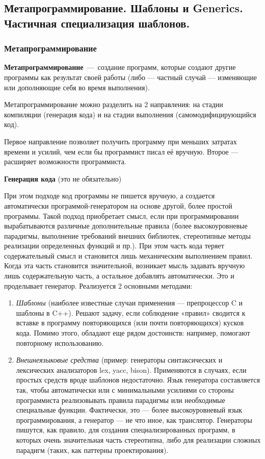 \subsection{Метапрограммирование. Шаблоны и Generics. Частичная специализация шаблонов.}

\subsubsection{Метапрограммирование}

\textbf{Метапрограммирование}~---~создание программ, которые создают другие программы как результат своей работы (либо — частный случай — изменяющие или дополняющие себя во время выполнения).

Метапрограммирование можно разделить на 2 направления: на стадии компиляции (генерация кода) и на стадии выполнения (самомодифицирующийся код).

Первое направление позволяет получить программу при меньших затратах времени и усилий, чем если бы программист писал её вручную. Второе — расширяет возможности программиста.

\textbf{Генерация кода} (это не обязательно)

При этом подходе код программы не пишется вручную, а создается автоматически программой-генератором на основе другой, более простой программы.
Такой подход приобретает смысл, если при программировании вырабатываются различные дополнительные правила (более высокоуровневые парадигмы, выполнение требований внешних библиотек, стереотипные методы реализации определенных функций и пр.). При этом часть кода теряет содержательный смысл и становится лишь механическим выполнением правил. Когда эта часть становится значительной, возникает мысль задавать вручную лишь содержательную часть, а остальное добавлять автоматически. Это и проделывает генератор. Реализуется 2 основными методами:

\begin{enumerate}
	\item  \emph{Шаблоны} (наиболее известные случаи применения — препроцессор C и шаблоны в C++). Решают задачу, если соблюдение «правил» сводится к вставке в программу повторяющихся (или почти повторяющихся) кусков кода. Помимо этого, обладают еще рядом достоинств: например, помогают повторному использованию.
	\item \emph{Внешнеязыковые средства} (пример: генераторы синтаксических и лексических анализаторов lex, yacc, bison). Применяются в случаях, если простых средств вроде шаблонов недостаточно. Язык генератора составляется так, чтобы автоматически или с минимальными усилиями со стороны программиста реализовывать правила парадигмы или необходимые специальные функции. Фактически, это — более высокоуровневый язык программирования, а генератор — не что иное, как транслятор.
	Генераторы пишутся, как правило, для создания специализированных программ, в которых очень значительная часть стереотипна, либо для реализации сложных парадигм (таких, как паттерны проектирования).
\end{enumerate}

